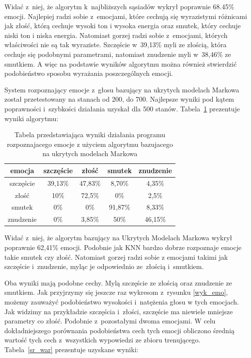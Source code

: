 \documentclass[declaration,shortabstract]{iithesis}
\begin{document}
Widać z~niej, że algorytm k~najbliższych sąsiadów wykrył poprawnie 68.45\% emocji. Najlepiej radzi sobie z~emocjami, które cechują się wyrazistymi różnicami jak złość, którą cechuje wysoki ton i wysoka energia oraz smutek, który cechuje niski ton i niska energia. Natomiast gorzej radzi sobie z~emocjami, których właściwości nie są tak wyraziste. Szczęście w~39,13\% myli ze złością, która cechuje się podobnymi parametrami, natomiast znudzenie myli w~38,46\% ze smutkiem. A więc na podstawie wyników algorytmu można również stwierdzić podobieństwo sposobu wyrażania poszczególnych emocji.

System rozpoznający emocje z~głosu bazujący na ukrytych modelach Markowa został przetestowany na stanach od 200, do 700. Najlepsze wyniki pod kątem poprawności i~szybkości działania uzyskał dla 500 stanów. Tabela~\ref{HMM_result} prezentuje wyniki algorytmu: 

\begin{table}[p]
\caption{Tabela przedstawiająca wyniki działania programu rozpoznajacego emocje z użyciem algorytmu bazujacego na ukrytych modelach Markowa}
\begin{center}
  \begin{tabular}{| c | c | c | c | c |}
    \hline
    emocja & szczęście & złość & smutek & znudzenie \\ \hline
    szczęście & 39,13\% & 47,83\% & 8,70\% & 4,35\% \\ \hline
	złość & 10\% & 72,5\% & 0\% & 2,5\% \\ \hline
	smutek & 0\% & 0\% & 91,87\% & 8,33\% \\ \hline
	znudzenie & 0\% & 3,85\% & 50\% & 46,15\% \\
    \hline
  \end{tabular}
  \label{HMM_result}
\end{center}
\end{table}

Widać z~niej, że algorytm bazujący na Ukrytych Modelach Markowa wykrył poprawnie 62,41\% emocji. Podobnie jak KNN bardzo dobrze rozpoznaje emocje takie smutek czy złość. Natomiast gorzej radzi sobie z emocjami takimi jak szczęście i~znudzenie, myląc je odpowiednio ze~złością i~smutkiem.

Oba wyniki mają podobne cechy. Mylą szczęście ze złością oraz znudzenie ze smutkiem. Jak przyjrzymy się jeszcze raz wykresom z~rysunku \ref{wyk_emo}, możemy zauważyć podobieństwo wysokości i~natężenia głosu w tych emocjach. Jak widzimy na przykładzie szczęścia i~złości, szczęście ma niewiele mniejsze parametry co złość. Podobnie z~pozostałymi dwoma emocjami. W celu dokładniejszego porównania podobieństwa cech tych emocji obliczono średnią wartość tych cech z~wszystkich wypowiedzi ze zbioru trenującego. Tabela~\ref{sr_war} prezentuje uzyskane wyniki:
\end{document}
